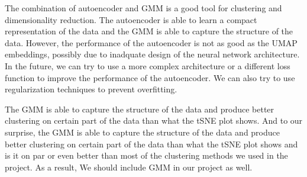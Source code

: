 \documentclass{article}
\begin{document}
The combination of autoencoder and GMM is a good tool for clustering and dimensionality reduction. The autoencoder is able to learn a compact representation of the data and the GMM is able to capture the structure of the data. However, the performance of the autoencoder is not as good as the UMAP embeddings, possibly due to inadquate design of the neural network architecture. In the future, we can try to use a more complex architecture or a different loss function to improve the performance of the autoencoder. We can also try to use regularization techniques to prevent overfitting. 

The GMM is able to capture the structure of the data and produce better clustering on certain part of the data than what the tSNE plot shows. And to our surprise, the GMM is able to capture the structure of the data and produce better clustering on certain part of the data than what the tSNE plot shows and is it on par or even better than most of the clustering methods we used in the project. As a result, We should include GMM in our project as well.

\newpage


\end{document}
